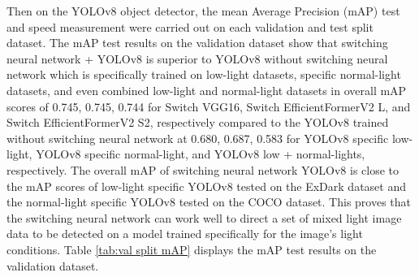 Then on the YOLOv8 object detector, the mean Average Precision (mAP) test and speed measurement were carried out on each validation and test split dataset. The mAP test results on the validation dataset show that switching neural network + YOLOv8 is superior to YOLOv8 without switching neural network which is specifically trained on low-light datasets, specific normal-light datasets, and even combined low-light and normal-light datasets in overall mAP scores of 0.745, 0.745, 0.744 for Switch VGG16, Switch EfficientFormerV2 L, and Switch EfficientFormerV2 S2, respectively compared to the YOLOv8 trained without switching neural network at 0.680, 0.687, 0.583 for YOLOv8 specific low-light, YOLOv8 specific normal-light, and YOLOv8 low + normal-lights, respectively. The overall mAP of switching neural network YOLOv8 is close to the mAP scores of low-light specific YOLOv8 tested on the ExDark dataset and the normal-light specific YOLOv8 tested on the COCO dataset. This proves that the switching neural network can work well to direct a set of mixed light image data to be detected on a model trained specifically for the image's light conditions. Table \ref{tab:val split mAP} displays the mAP test results on the validation dataset.

